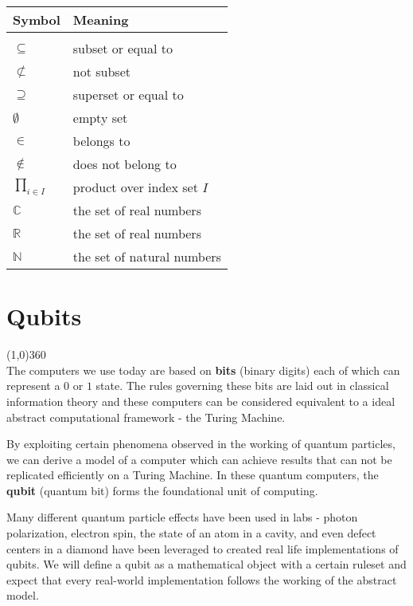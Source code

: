 \documentclass[12pt,twoside,fleqn]{report}
\theoremstyle{thmstyle}
\begin{document}
\begin{tabular}{p{2cm}p{5cm}}
\textbf{Symbol} & \textbf{Meaning}\\
\hline
& \\
$\subseteq$ & subset or equal to \\%
$\not\subset$ & not subset\\%
$\supseteq$ & superset or equal to \\
$\emptyset$ & empty set\\%
$\in$ & belongs to\\%
$\not \in $ & does not belong to \\
$\displaystyle\prod_{i \in I}$ & product over index set $I$ \\
$\mathbb{C}$ & the set of real numbers\\%
$\mathbb{R}$ & the set of real numbers\\%
$\mathbb{N}$ & the set of natural numbers\\%
\end{tabular}

\tableofcontents
\newpage
{}

\chapter{Qubits}

\line(1,0){360} \\

The computers we use today are based on \textbf{bits} (binary digits) each of which can represent a $0$ or $1$ state. The rules governing these bits are laid out in classical information theory and these computers can be considered equivalent to a ideal abstract computational framework - the Turing Machine.

By exploiting certain phenomena observed in the working of quantum particles, we can derive a model of a computer which can achieve results that can not be replicated efficiently on a Turing Machine. In these quantum computers, the \textbf{qubit} (quantum bit) forms the foundational unit of computing.

Many different quantum particle effects have been used in labs - photon polarization, electron spin, the state of an atom in a cavity, and even defect centers in a diamond have been leveraged to created real life implementations of qubits. We will define a qubit as a mathematical object with a certain ruleset and expect that every real-world implementation follows the working of the abstract model.
\end{document}
